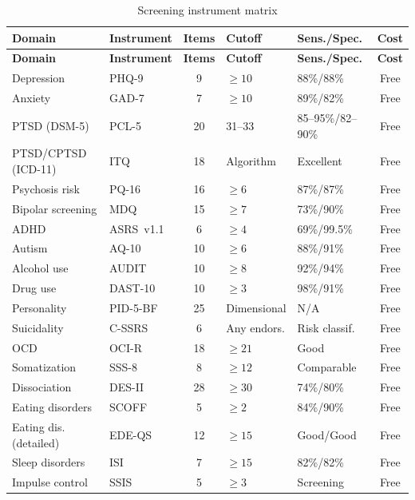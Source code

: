 \documentclass[11pt,a4paper]{article}
\begin{document}
\begin{longtable}{p{2.5cm}p{2.3cm}cp{1.5cm}p{2.5cm}c}
\caption{Screening instrument matrix} \label{tab:instruments} \\
\toprule
\textbf{Domain} & \textbf{Instrument} & \textbf{Items} & \textbf{Cutoff} & \textbf{Sens./Spec.} & \textbf{Cost} \\
\midrule
\endfirsthead
\toprule
\textbf{Domain} & \textbf{Instrument} & \textbf{Items} & \textbf{Cutoff} & \textbf{Sens./Spec.} & \textbf{Cost} \\
\midrule
\endhead
Depression & PHQ-9 & 9 & $\geq 10$ & 88\%/88\% & Free \\
\addlinespace
Anxiety & GAD-7 & 7 & $\geq 10$ & 89\%/82\% & Free \\
\addlinespace
PTSD (DSM-5) & PCL-5 & 20 & 31--33 & 85--95\%/82--90\% & Free \\
\addlinespace
PTSD/CPTSD (ICD-11) & ITQ & 18 & Algorithm & Excellent & Free \\
\addlinespace
Psychosis risk & PQ-16 & 16 & $\geq 6$ & 87\%/87\% & Free \\
\addlinespace
Bipolar screening & MDQ & 15 & $\geq 7$ & 73\%/90\% & Free \\
\addlinespace
ADHD & ASRS~v1.1 & 6 & $\geq 4$ & 69\%/99.5\% & Free \\
\addlinespace
Autism & AQ-10 & 10 & $\geq 6$ & 88\%/91\% & Free \\
\addlinespace
Alcohol use & AUDIT & 10 & $\geq 8$ & 92\%/94\% & Free \\
\addlinespace
Drug use & DAST-10 & 10 & $\geq 3$ & 98\%/91\% & Free \\
\addlinespace
Personality & PID-5-BF & 25 & Dimensional & N/A & Free \\
\addlinespace
Suicidality & C-SSRS & 6 & Any endors. & Risk classif. & Free \\
\addlinespace
OCD & OCI-R & 18 & $\geq 21$ & Good & Free \\
\addlinespace
Somatization & SSS-8 & 8 & $\geq 12$ & Comparable & Free \\
\addlinespace
Dissociation & DES-II & 28 & $\geq 30$ & 74\%/80\% & Free \\
\addlinespace
Eating disorders & SCOFF & 5 & $\geq 2$ & 84\%/90\% & Free \\
\addlinespace
Eating dis. (detailed) & EDE-QS & 12 & $\geq 15$ & Good/Good & Free \\
\addlinespace
Sleep disorders & ISI & 7 & $\geq 15$ & 82\%/82\% & Free \\
\addlinespace
Impulse control & SSIS & 5 & $\geq 3$ & Screening & Free \\
\bottomrule
\end{longtable}
\end{document}
